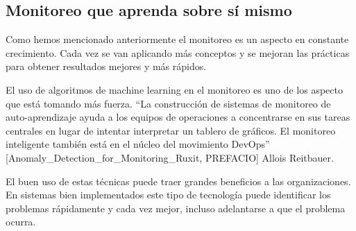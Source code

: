 \subsection{Monitoreo que aprenda sobre sí mismo}
\label{que-aprenda}

Como hemos mencionado anteriormente el monitoreo es un aspecto en constante crecimiento. Cada vez se van aplicando más conceptos y se mejoran las prácticas para obtener resultados mejores y más rápidos.

El uso de algoritmos de machine learning en el monitoreo es uno de los aspecto que está tomando más fuerza. “La construcción de sistemas de monitoreo de auto-aprendizaje ayuda a los equipos de operaciones a concentrarse en sus tareas centrales en lugar de intentar interpretar un tablero de gráficos. El monitoreo inteligente también está en el núcleo del movimiento DevOps”  [Anomaly\_Detection\_for\_Monitoring\_Ruxit,  PREFACIO] Allois Reitbauer.

El buen uso de estas técnicas puede traer grandes beneficios a las organizaciones. En sistemas bien implementados este tipo de tecnología puede identificar los problemas rápidamente y cada vez mejor, incluso adelantarse a que el problema ocurra.